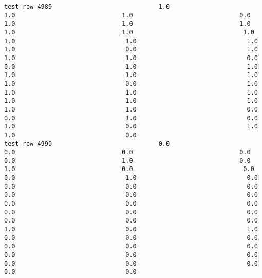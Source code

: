 \documentclass[11pt]{article}
\begin{document}
\begin{verbatim}
test row 4989                             1.0                             1.0                             1.0                             0.0                             1.0                             1.0                             1.0                             1.0                             1.0                              1.0                              1.0                              1.0                              1.0                              1.0                              0.0                              1.0                              1.0                              1.0                              0.0                              0.0                              1.0                              1.0                              1.0                              1.0                              1.0                              1.0                              0.0                              1.0                              1.0                              1.0                              1.0                              1.0                              1.0                              1.0                              1.0                              1.0                              0.0                              0.0                              1.0                              0.0                              1.0                              0.0                              1.0                              1.0                              0.0
test row 4990                             0.0                             0.0                             0.0                             0.0                             0.0                             1.0                             0.0                             1.0                             0.0                              0.0                              0.0                              1.0                              0.0                              0.0                              0.0                              0.0                              0.0                              0.0                              0.0                              0.0                              0.0                              0.0                              0.0                              0.0                              0.0                              0.0                              0.0                              0.0                              1.0                              0.0                              1.0                              0.0                              0.0                              0.0                              0.0                              0.0                              0.0                              0.0                              0.0                              0.0                              0.0                              0.0                              0.0                              0.0                              0.0

\end{verbatim}
\end{document}
